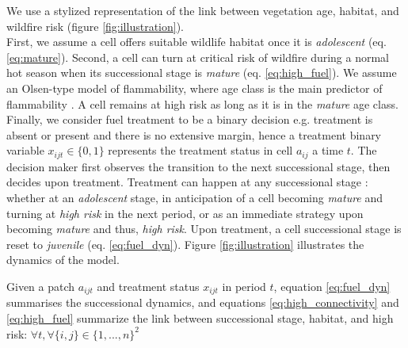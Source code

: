 We use a stylized representation of the link between vegetation age, habitat, and wildfire risk (figure \ref{fig:illustration}). \\
First, we assume a cell offers suitable wildlife habitat once it is \textit{adolescent} (eq. \ref{eq:mature}). Second, a cell can turn at critical risk of wildfire during a normal hot season when its successional stage is \textit{mature} (eq. \ref{eq:high_fuel}). We assume an Olsen-type model of flammability, where age class is the main predictor of flammability \citep{Olson1963,mccarthy_theoretical_2001,mccoll_gausden_pathways_2019}. A cell remains at high risk as long as it is in the \textit{mature} age class. \\
Finally, we consider fuel treatment to be a binary decision e.g. treatment is absent or present and there is no extensive margin, hence a treatment binary variable $x_{ijt}\in\{0,1\}$ represents the treatment status in cell $a_{ij}$ a time $t$. The decision maker first observes the transition to the next successional stage, then decides upon treatment.
Treatment can happen at any successional stage : whether at an \textit{adolescent} stage, in anticipation of a cell becoming \textit{mature} and turning at \textit{high risk} in the next period, or as an immediate strategy upon becoming \textit{mature} and thus, \textit{high risk}.
Upon treatment, a cell successional stage is reset to \textit{juvenile} (eq. \ref{eq:fuel_dyn}). Figure \ref{fig:illustration} illustrates the dynamics of the model.

Given a patch $a_{ijt}$ and treatment status $x_{ijt}$ in period $t$, equation \ref{eq:fuel_dyn} summarises the successional dynamics, and equations \ref{eq:high_connectivity} and \ref{eq:high_fuel} summarize the link between successional stage, habitat, and high risk: $\forall t, \forall \{i,j\} \in \{1,..., n\}^2$

